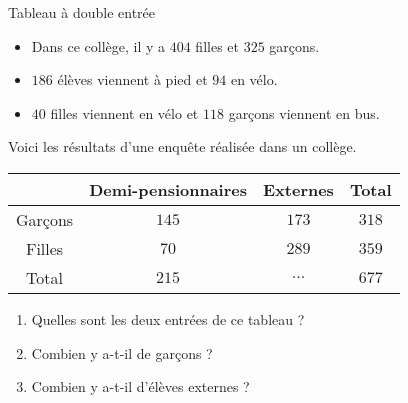 \begin{pageCours}
\begin{Ex}{Tableau à double entrée}
\begin{itemize}
 \item Dans ce collège, il y a $404$ filles et $325$ garçons.
 \item $186$ élèves viennent à pied et $94$ en vélo.
 \item $40$ filles viennent en vélo et $118$ garçons viennent en bus.
\end{itemize}

\end{Ex}

\end{pageCours}




\begin{pageAD} 



Voici les résultats d'une enquête réalisée dans un collège.

 \begin{center}
 \begin{tabular}{c|c|c|c}
  & Demi-pensionnaires & Externes & Total \\\hline 
  Garçons & $145$ & $173$ & $318$ \\\hline
  Filles & $70$ & $289$ & $359$ \\\hline
  Total & $215$ & $...$ & $677$ \\
 \end{tabular}
 \end{center}
 
 \begin{enumerate}
 \item Quelles sont les deux entrées de ce tableau ? 
 \item Combien y a-t-il de garçons ? 
 \item Combien y a-t-il d'élèves externes ? 
\end{enumerate}



\end{pageAD} 


